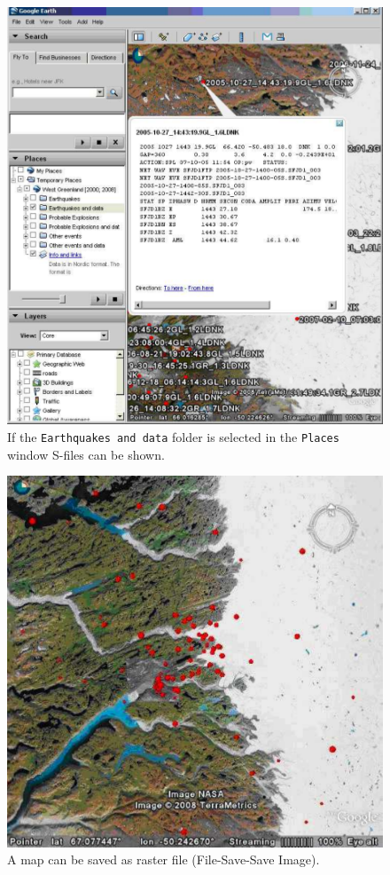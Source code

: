 \begin{figure}
\centerline{\includegraphics[width=0.9\linewidth]{fig/fig33}}
\caption{If the \texttt{Earthquakes and data} folder is selected in 
the \texttt{Places} window S-files can be shown.}
\end{figure}

\begin{figure}
\centerline{\includegraphics[width=0.9\linewidth]{fig/fig34}}
\caption{A map can be saved as raster file (File-Save-Save Image).}
\end{figure}

